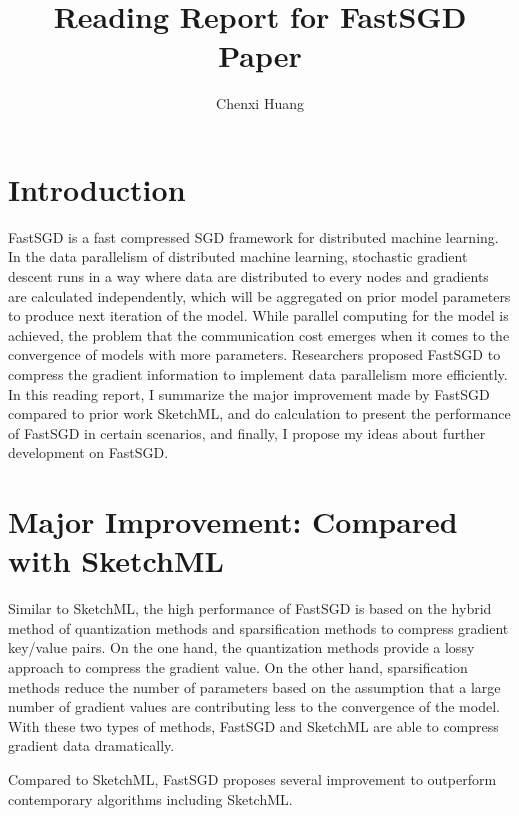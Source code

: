 \documentclass[journal]{IEEEtran}
\begin{document}
\title{Reading Report for FastSGD Paper}

\author{Chenxi Huang}

\maketitle

\section{Introduction}

FastSGD is a fast compressed SGD framework for distributed machine learning\cite{https://doi.org/10.48550/arxiv.2112.04291}. In the data parallelism of distributed machine learning, stochastic gradient descent runs in a way where data are distributed to every nodes and gradients are calculated independently, which will be aggregated on prior model parameters to produce next iteration of the model. While parallel computing for the model is achieved, the problem that the communication cost emerges when it comes to the convergence of models with more parameters. Researchers proposed FastSGD to compress the gradient information to implement data parallelism more efficiently. In this reading report, I summarize the major improvement made by FastSGD compared to prior work SketchML, and do calculation to present the performance of FastSGD in certain scenarios, and finally, I propose my ideas about further development on FastSGD.

\section{Major Improvement: Compared with SketchML}

Similar to SketchML, the high performance of FastSGD is based on the hybrid method of quantization methods and sparsification methods to compress gradient key/value pairs. On the one hand, the quantization methods provide a lossy approach to compress the gradient value. On the other hand, sparsification methods reduce the number of parameters based on the assumption that a large number of gradient values are contributing less to the convergence of the model. With these two types of methods, FastSGD and SketchML are able to compress gradient data dramatically.

Compared to SketchML, FastSGD\cite{https://doi.org/10.48550/arxiv.2112.04291} proposes several improvement to outperform contemporary algorithms including SketchML.
\end{document}
